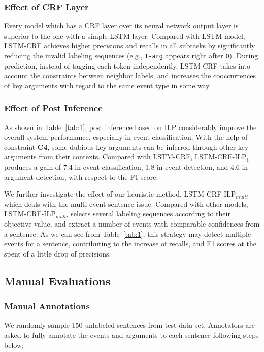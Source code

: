 \documentclass{article}
\begin{document}
\subsubsection{Effect of CRF Layer}
Every model which has a CRF layer over its neural network output layer is superior to the one with a simple LSTM layer. Compared with LSTM model, LSTM-CRF achieves higher precisions and recalls in all subtasks by significantly reducing the invalid labeling sequences (e.g., \texttt{I-arg} appears right after \texttt{O}). During prediction, instead of tagging each token independently, LSTM-CRF takes into account the constraints between neighbor labels, and increases the cooccurrences of key arguments with regard to the same event type in some way.

\subsubsection{Effect of Post Inference}
As shown in Table~\ref{tab:1}, post inference based on ILP considerably improve the overall system performance, especially in event classification. With the help of constraint \textbf{C4},  some dubious key arguments can be inferred through other key arguments from their contexts. Compared with LSTM-CRF, LSTM-CRF-ILP$_1$ produces a gain of 7.4 in event classification, 1.8 in event detection, and 4.6 in argument detection, with respect to the F1 score.

We further investigate the effect of our heuristic method, LSTM-CRF-ILP$_{multi}$ which deals with the multi-event sentence issue. Compared with other models, LSTM-CRF-ILP$_{multi}$ selects several labeling sequences according to their objective value, and extract a number of events with comparable confidences from a sentence. As we can see from Table~\ref{tab:1}, this strategy may detect multiple events for a sentence, contributing to the increase of recalls, and F1 scores at the spent of a little drop of precisions. 

\subsection{Manual Evaluations}
\subsubsection{Manual Annotations}
We randomly sample 150 unlabeled sentences from test data set. Annotators are asked to fully annotate the events and arguments to each sentence following steps below: 
\end{document}
